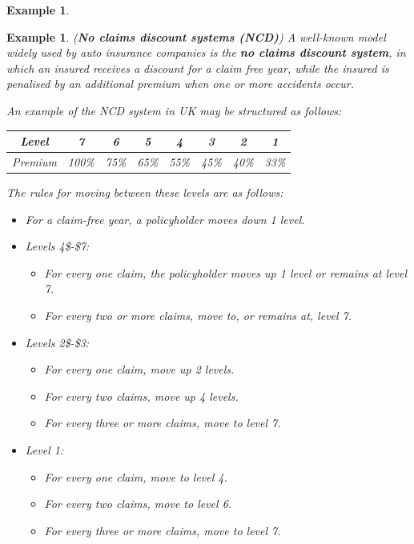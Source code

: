 \documentclass[
]{book}
\theoremstyle{definition}
\theoremstyle{definition}
\newtheorem{example}{Example}[chapter]
\theoremstyle{definition}
\theoremstyle{definition}
\theoremstyle{remark}
\begin{document}
\begin{example}
\protect\hypertarget{exm:unlabeled-div-1}{}\label{exm:unlabeled-div-1}

\textbf{Example 1}. \emph{(\textbf{No claims discount systems (NCD)}) A well-known
model widely used by auto insurance companies is the \textbf{no claims
discount system}, in which an insured receives a discount for a claim
free year, while the insured is penalised by an additional premium when
one or more accidents occur.}

\emph{An example of the NCD system in UK may be structured as follows:}

\begin{longtable}[]{@{}cccccccc@{}}
\toprule
\emph{Level} & \emph{7} & \emph{6} & \emph{5} & \emph{4} & \emph{3} & \emph{2} & \emph{1} \\
\midrule
\endhead
\emph{Premium} & \emph{100\%} & \emph{75\%} & \emph{65\%} & \emph{55\%} & \emph{45\%} & \emph{40\%} & \emph{33\%} \\
\bottomrule
\end{longtable}

\emph{The rules for moving between these levels are as follows:}

\begin{itemize}
\item
  \emph{For a claim-free year, a policyholder moves down 1 level.}
\item
  \emph{Levels 4\$-\$7:}

  \begin{itemize}
  \item
    \emph{For every one claim, the policyholder moves up 1 level or
    remains at level 7.}
  \item
    \emph{For every two or more claims, move to, or remains at, level 7.}
  \end{itemize}
\item
  \emph{Levels 2\$-\$3:}

  \begin{itemize}
  \item
    \emph{For every one claim, move up 2 levels.}
  \item
    \emph{For every two claims, move up 4 levels.}
  \item
    \emph{For every three or more claims, move to level 7.}
  \end{itemize}
\item
  \emph{Level 1:}

  \begin{itemize}
  \item
    \emph{For every one claim, move to level 4.}
  \item
    \emph{For every two claims, move to level 6.}
  \item
    \emph{For every three or more claims, move to level 7.}
  \end{itemize}
\end{itemize}


\end{example}
\end{document}
